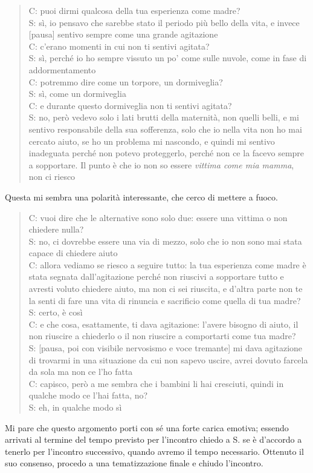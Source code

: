 \begin{verse}
C: puoi dirmi qualcosa della tua esperienza come madre?\\
S: sì, io pensavo che sarebbe stato il periodo più bello della vita, e invece [pausa] sentivo sempre come una grande agitazione\\
C: c'erano momenti in cui non ti sentivi agitata?\\
S: sì, perché io ho sempre vissuto un po' come sulle nuvole, come in fase di addormentamento\\
C: potremmo dire come un torpore, un dormiveglia?\\
S: sì, come un dormiveglia\\
C: e durante questo dormiveglia non ti sentivi agitata?\\
S: no, però vedevo solo i lati brutti della maternità, non quelli belli, e mi sentivo responsabile della sua sofferenza, solo che io nella vita non ho mai cercato aiuto, se ho un problema mi nascondo, e quindi mi sentivo inadeguata perché non potevo proteggerlo, perché non ce la facevo sempre a sopportare. Il punto è che io non so essere \emph{vittima come mia mamma}, non ci riesco\\
\end{verse}

\noindent Questa mi sembra una polarità interessante, che cerco di mettere a fuoco.

\begin{verse}
C: vuoi dire che le alternative sono solo due: essere una vittima o non chiedere nulla?\\
S: no, ci dovrebbe essere una via di mezzo, solo che io non sono mai stata capace di chiedere aiuto\\
C: allora vediamo se riesco a seguire tutto: la tua esperienza come madre è stata segnata dall'agitazione perché non riuscivi a sopportare tutto e avresti voluto chiedere aiuto, ma non ci sei riuscita, e d'altra parte non te la senti di fare una vita di rinuncia e sacrificio come quella di tua madre?\\
S: certo, è così\\
C: e che cosa, esattamente, ti dava agitazione: l'avere bisogno di aiuto, il non riuscire a chiederlo o il non riuscire a comportarti come tua madre?\\
S: [pausa, poi con visibile nervosismo e voce tremante] mi dava agitazione di trovarmi in una situazione da cui non sapevo uscire, avrei dovuto farcela da sola ma non ce l'ho fatta\\
C: capisco, però a me sembra che i bambini li hai cresciuti, quindi in qualche modo ce l'hai fatta, no?\\
S: eh, in qualche modo sì\\
\end{verse}

\noindent Mi pare che questo argomento porti con sé una forte carica emotiva; essendo arrivati al termine del tempo previsto per l'incontro chiedo a S. se è d'accordo a tenerlo per l'incontro successivo, quando avremo il tempo necessario. Ottenuto il suo consenso, procedo a una tematizzazione finale e chiudo l'incontro.
